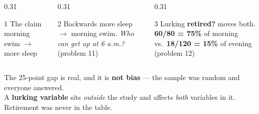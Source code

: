 \documentclass[aspectratio=169, 11pt]{beamer}
\newcommand{\redink}[1]{{\color{redacc}\bfseries #1}}
\begin{document}
\begin{frame}[t, plain]
  \vspace{4pt}
  \begin{columns}[t]
    \begin{column}{0.31\textwidth}
      \begin{block}{1 The claim}
        morning swim $\to$ more sleep
      \end{block}
    \end{column}
    \begin{column}{0.31\textwidth}
      \begin{block}{2 Backwards}
        more sleep $\to$ morning swim. \emph{Who can get up at 6 a.m.?} (problem 11)
      \end{block}
    \end{column}
    \begin{column}{0.31\textwidth}
      \begin{block}{3 Lurking}
        \textbf{retired?} moves both. \redink{60/80 = 75\%} of morning vs.\ \redink{18/120 =
        15\%} of evening (problem 12)
      \end{block}
    \end{column}
  \end{columns}
  \vspace{10pt}
  \begin{center}
    {\large The 25-point gap is real, and it is \redink{not bias} --- the sample was random and
    everyone answered.}\\[6pt]
    {\small\color{slate} A \textbf{lurking variable} sits \emph{outside} the study and affects
    \emph{both} variables in it. Retirement was never in the table.}
  \end{center}
\end{frame}
\end{document}
